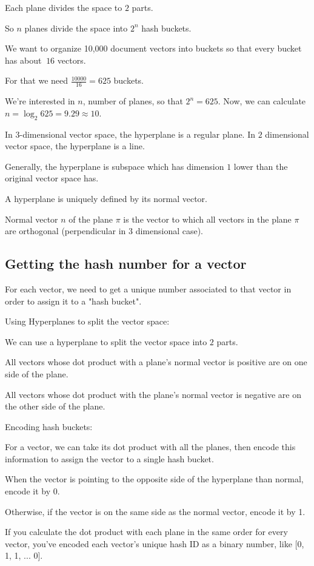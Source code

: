 \documentclass[4apaper,12pt]{book}
\begin{document}
\begin{description}
\item Each plane divides the space to $2$ parts.
\item So $n$ planes divide the space into $2^{n}$ hash buckets.
\item We want to organize 10,000 document vectors into buckets so that every bucket has about $~16$ vectors.
\item For that we need $\frac{10000}{16}=625$ buckets.
\item We're interested in $n$, number of planes, so that $2^{n}= 625$. Now, we can calculate $n=\log_{2}625 = 9.29 \approx 10$.

\item  In $3$-dimensional vector space, the hyperplane is a regular plane. In $2$ dimensional vector space, the hyperplane is a line.
\item Generally, the hyperplane is subspace which has dimension $1$ lower than the original vector space has.
\item A hyperplane is uniquely defined by its normal vector.
\item Normal vector $n$ of the plane $\pi$ is the vector to which all vectors in the plane $\pi$ are orthogonal (perpendicular in $3$ dimensional case).
\subsection{ Getting the hash number for a vector}

\item For each vector, we need to get a unique number associated to that vector in order to assign it to a "hash bucket".

\item Using Hyperplanes to split the vector space:
\item We can use a hyperplane to split the vector space into $2$ parts.
\item  All vectors whose dot product with a plane's normal vector is positive are on one side of the plane.
\item All vectors whose dot product with the plane's normal vector is negative are on the other side of the plane.

\item Encoding hash buckets:
\item For a vector, we can take its dot product with all the planes, then encode this information to assign the vector to a single hash bucket.
\item When the vector is pointing to the opposite side of the hyperplane than normal, encode it by 0.
\item Otherwise, if the vector is on the same side as the normal vector, encode it by 1.
\item If you calculate the dot product with each plane in the same order for every vector, you've encoded each vector's unique hash ID as a binary number, like [0, 1, 1, ... 0].


\end{description}
\end{document}
